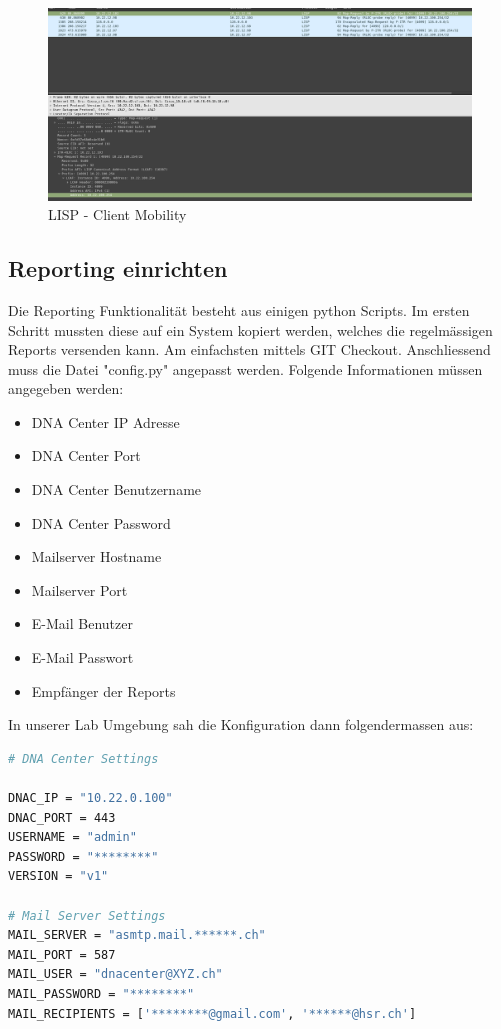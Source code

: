 \begin{figure}[H]
	\centering
	\includegraphics[width=14cm]{img/secondtry/client-mobility-dump.png}
	\caption{LISP - Client Mobility}
	\label{fig:lisp-client-mobility}
\end{figure}


\subsection{Reporting einrichten}

Die Reporting Funktionalität besteht aus einigen python Scripts. Im ersten Schritt mussten diese auf ein System kopiert werden, welches die regelmässigen Reports versenden kann. Am einfachsten mittels GIT Checkout.
Anschliessend muss die Datei "config.py" angepasst werden. Folgende Informationen müssen angegeben werden:
\begin{itemize}
	\item DNA Center IP Adresse
	\item DNA Center Port
	\item DNA Center Benutzername
	\item DNA Center Password
	\item Mailserver Hostname
	\item Mailserver Port
	\item E-Mail Benutzer
	\item E-Mail Passwort
	\item Empfänger der Reports
\end{itemize}


In unserer Lab Umgebung sah die Konfiguration dann folgendermassen aus:

\begin{lstlisting}[language=bash]
# DNA Center Settings

DNAC_IP = "10.22.0.100"
DNAC_PORT = 443
USERNAME = "admin"
PASSWORD = "********"
VERSION = "v1"

# Mail Server Settings
MAIL_SERVER = "asmtp.mail.******.ch"
MAIL_PORT = 587
MAIL_USER = "dnacenter@XYZ.ch"
MAIL_PASSWORD = "********"
MAIL_RECIPIENTS = ['********@gmail.com', '******@hsr.ch']
\end{lstlisting}

